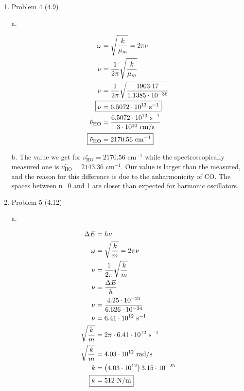 \documentclass[12pt]{article}
\begin{document}
\begin{enumerate}
    \newpage
    \item Problem 4 (4.9)
    
    a.
    
    \begin{align*}
        \omega &= \sqrt{\frac{k}{\mu_m}} = 2\pi\nu \\
        \nu &= \frac{1}{2\pi}\sqrt{\frac{k}{\mu_m}} \\
        \nu &= \frac{1}{2\pi}\sqrt{\frac{1903.17}{1.1385\cdot10^{-36}}} \\
        \Aboxed{\nu &= 6.5072\cdot10^{13} \text{ s$^{-1}$}} \\
        \tilde{\nu}_{\text{HO}} &= \frac{6.5072\cdot10^{13} \text{ s$^{-1}$}}{3\cdot10^{10} \text{ cm/s}} \\
        \Aboxed{\tilde{\nu}_{\text{HO}} &= 2170.56 \text{ cm$^{-1}$}}
    \end{align*}

    b. The value we get for $\tilde{\nu_{\text{HO}}} = 2170.56 \text{ cm$^{-1}$}$ while the spectroscopically measured one is $\tilde{\nu_{\text{HO}}} = 2143.36 \text{ cm$^{-1}$}$. Our value is larger than the measured, and the reason for this difference is due to the anharmonicity of CO. The spaces between n=0 and 1 are closer than expected for harmonic oscillators.
    
    \newpage
    \item Problem 5 (4.12)
    
    a. 

    \begin{align*}
        \Delta E &= h\nu \\
        \omega &= \sqrt{\frac{k}{m}} = 2\pi\nu \\
        \nu &= \frac{1}{2\pi}\sqrt{\frac{k}{m}} \\
        \nu &= \frac{\Delta E}{h} \\
        \nu &= \frac{4.25 \cdot 10^{-21}}{6.626\cdot10^{-34}} \\
        \nu &= 6.41 \cdot 10^{12} \text{ s$^{-1}$} \\
        \sqrt{\frac{k}{m}} &= 2\pi \cdot 6.41 \cdot 10^{12} \text{ s$^{-1}$} \\
        \sqrt{\frac{k}{m}} &= 4.03 \cdot 10^{12} \text{ rad/s} \\
        k &= \left(4.03 \cdot 10^{12}\right) 3.15 \cdot 10^{-25} \\
        \Aboxed{k &= 512 \text{ N/m} }
    \end{align*}


\end{enumerate}
\end{document}
